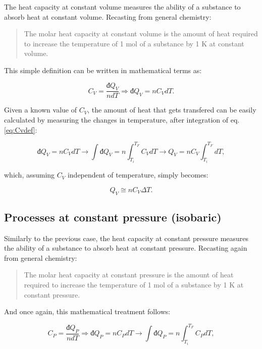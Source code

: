 \documentclass[
]{book}
\theoremstyle{definition}
\theoremstyle{definition}
\theoremstyle{definition}
\theoremstyle{remark}
\begin{document}
The heat capacity at constant volume measures the ability of a substance to absorb heat at constant volume. Recasting from general chemistry:

\begin{quote}
The molar heat capacity at constant volume is the amount of heat required to increase the temperature of 1 mol of a substance by 1 K at constant volume.
\end{quote}

This simple definition can be written in mathematical terms as:

\begin{equation}
  C_V = \frac{đ Q_V}{n dT} \Rightarrow đ Q_V = n C_V dT.
  \label{eq:Cvdef}
\end{equation}

Given a known value of \(C_V\), the amount of heat that gets transfered can be easily calculated by measuring the changes in temperature, after integration of eq. \eqref{eq:Cvdef}:

\begin{equation}
  đ Q_V = n C_V dT \rightarrow \int đ Q_V = n \int_{T_i}^{T_F}C_V dT \rightarrow Q_V = n C_V \int_{T_i}^{T_F}dT,
  \label{eq:Cvint1}
\end{equation}

which, assuming \(C_V\) independent of temperature, simply becomes:

\begin{equation}
  Q_V \cong n C_V \Delta T.
  \label{eq:Cvint}
\end{equation}

\hypertarget{heatconstp}{%
\subsection{Processes at constant pressure (isobaric)}\label{heatconstp}}

Similarly to the previous case, the heat capacity at constant pressure measures the ability of a substance to absorb heat at constant pressure. Recasting again from general chemistry:

\begin{quote}
The molar heat capacity at constant pressure is the amount of heat required to increase the temperature of 1 mol of a substance by 1 K at constant pressure.
\end{quote}

And once again, this mathematical treatment follows:

\begin{equation}
  C_P = \frac{đ Q_P}{n dT} \Rightarrow đ Q_P = n C_P dT \rightarrow \int đ Q_P = n \int_{T_i}^{T_F}C_P dT,
  \label{eq:Cpdef}
\end{equation}
\end{document}
